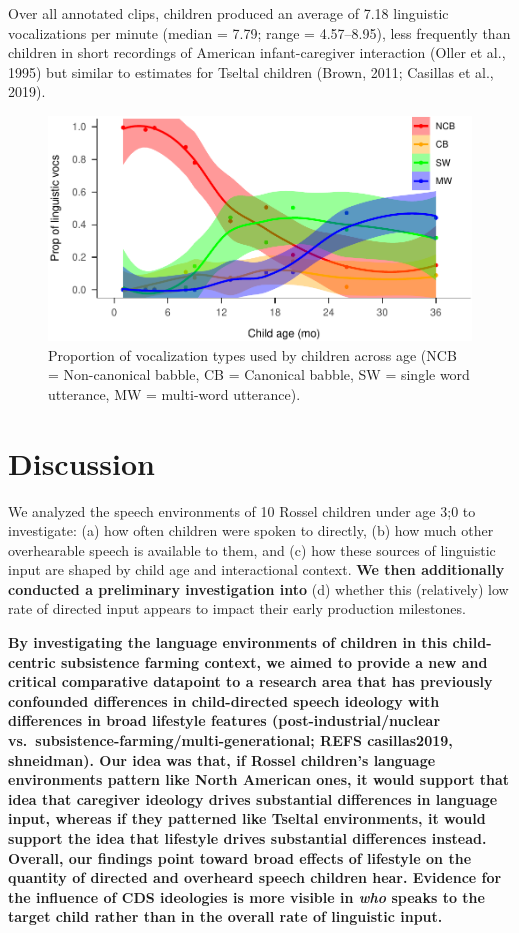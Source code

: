 \documentclass[,man,floatsintext]{apa6}
\begin{document}
Over all annotated clips, children produced an average of 7.18
linguistic vocalizations per minute (median = 7.79; range = 4.57--8.95),
less frequently than children in short recordings of American
infant-caregiver interaction (Oller et al., 1995) but similar to
estimates for Tseltal children (Brown, 2011; Casillas et al., 2019).

\begin{figure}
\centering
\includegraphics{Yeli-CLE_files/figure-latex/fig4-1.pdf}
\caption{\label{fig:fig4}Proportion of vocalization types used by children
across age (NCB = Non-canonical babble, CB = Canonical babble, SW =
single word utterance, MW = multi-word utterance).}
\end{figure}

\section{Discussion}\label{disc}

We analyzed the speech environments of 10 Rossel children under age 3;0
to investigate: (a) how often children were spoken to directly, (b) how
much other overhearable speech is available to them, and (c) how these
sources of linguistic input are shaped by child age and interactional
context. \textbf{We then additionally conducted a preliminary
investigation into} (d) whether this (relatively) low rate of directed
input appears to impact their early production milestones.

\textbf{By investigating the language environments of children in this
child-centric subsistence farming context, we aimed to provide a new and
critical comparative datapoint to a research area that has previously
confounded differences in child-directed speech ideology with
differences in broad lifestyle features (post-industrial/nuclear
vs.~subsistence-farming/multi-generational; REFS casillas2019,
shneidman). Our idea was that, if Rossel children's language
environments pattern like North American ones, it would support that
idea that caregiver ideology drives substantial differences in language
input, whereas if they patterned like Tseltal environments, it would
support the idea that lifestyle drives substantial differences instead.
Overall, our findings point toward broad effects of lifestyle on the
quantity of directed and overheard speech children hear. Evidence for
the influence of CDS ideologies is more visible in \emph{who} speaks to
the target child rather than in the overall rate of linguistic input.}
\end{document}
